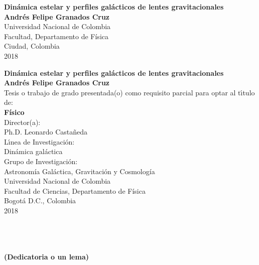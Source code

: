 \begin{center}
\begin{figure}
\centering%
%
\end{figure}
\thispagestyle{empty} \vspace*{2.0cm} \textbf{\huge
Din\'amica estelar y perfiles gal\'acticos de lentes gravitacionales}\\[6.0cm]
\Large\textbf{Andr\'es Felipe Granados Cruz}\\[6.0cm]
\small Universidad Nacional de Colombia\\
Facultad, Departamento de F\'isica\\
Ciudad, Colombia\\
2018\\
\end{center}

\newpage{\pagestyle{empty}\cleardoublepage}

\newpage
\begin{center}
\thispagestyle{empty} \vspace*{0cm} \textbf{\huge
Din\'amica estelar y perfiles gal\'acticos de lentes gravitacionales}\\[3.0cm]
\Large\textbf{Andr\'es Felipe Granados Cruz}\\[3.0cm]
\small Tesis o trabajo de grado presentada(o) como requisito parcial para optar al
t\'{\i}tulo de:\\
\textbf{F\'isico}\\[2.5cm]
Director(a):\\
Ph.D. Leonardo Castañeda\\[2.0cm]
L\'{\i}nea de Investigaci\'{o}n:\\
Dinámica galáctica\\
Grupo de Investigaci\'{o}n:\\
Astronomía Galáctica, Gravitación y Cosmología\\[2.5cm]
Universidad Nacional de Colombia\\
Facultad de Ciencias, Departamento de Física\\
Bogotá D.C., Colombia\\
2018\\
\end{center}

\newpage{\pagestyle{empty}\cleardoublepage}

\newpage
\thispagestyle{empty} \textbf{}\normalsize
\\\\\\%
\textbf{(Dedicatoria o un lema)}\\[4.0cm]

